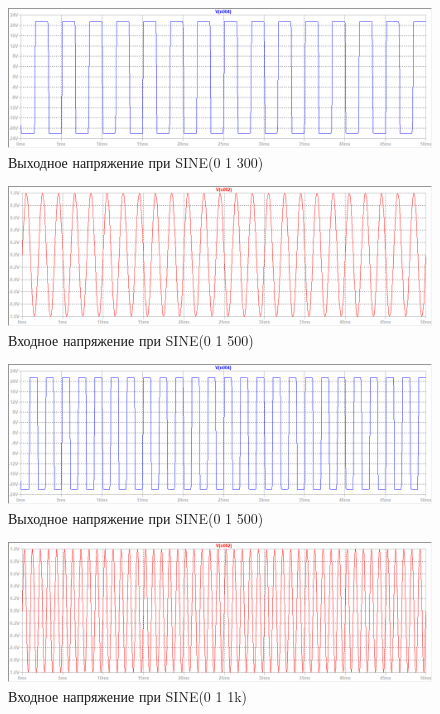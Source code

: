 \documentclass[a4paper, 12pt]{article}
\begin{document}
    \begin{figure}[H]
        \centering
        \includegraphics[scale=0.46]{3task_sine_out_1V_300f.png}
        \captionsetup{skip=0pt}
        \caption{Выходное напряжение при SINE(0 1 300)}
        \label{fig:3task_sine_in_1V_300f}
    \end{figure}
    \begin{figure}[H]
        \centering
        \includegraphics[scale=0.46]{3task_sine_in_1V_500f.png}
        \captionsetup{skip=0pt}
        \caption{Входное напряжение при SINE(0 1 500)}
        \label{fig:3task_sine_in_1V_500f}
    \end{figure}
    \begin{figure}[H]
        \centering
        \includegraphics[scale=0.46]{3task_sine_out_1V_500f.png}
        \captionsetup{skip=0pt}
        \caption{Выходное напряжение при SINE(0 1 500)}
        \label{fig:3task_sine_in_1V_500f}
    \end{figure}
    \begin{figure}[H]
        \centering
        \includegraphics[scale=0.46]{3task_sine_in_1V_1kf.png}
        \captionsetup{skip=0pt}
        \caption{Входное напряжение при SINE(0 1 1k)}
        \label{fig:3task_sine_in_1V_1kf}
    \end{figure}
\end{document}
